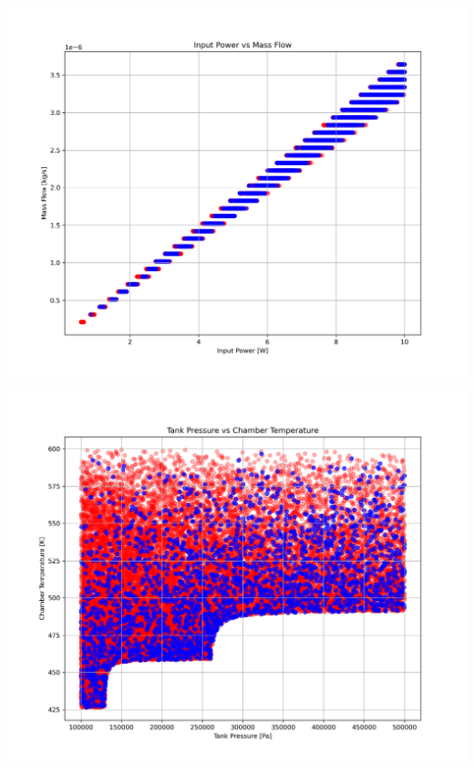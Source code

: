 \documentclass{homework}
\begin{document}
\begin{multicols}{2}
  \begin{minipage}{\linewidth}
      \centering
      \includegraphics[width=\linewidth]{images/input_power_mass_flow.png}
      \label{fig:power_massflow}
  \end{minipage}
  
  \begin{minipage}{\linewidth}
      \centering
      \includegraphics[width=\linewidth]{images/tank_pressure_chamber_temperature_old.png}
      \label{fig:pressure_temp_old}
  \end{minipage}  
  

\end{multicols}
\end{document}
